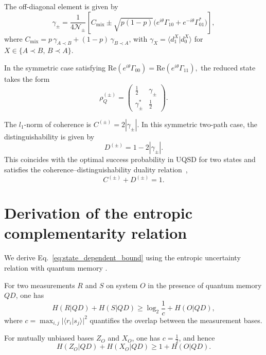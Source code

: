 \documentclass[aps,pra,reprint,superscriptaddress]{revtex4-2}
\begin{document}
The off-diagonal element is given by
\begin{equation}
\gamma_\pm
=
\frac{1}{4\mathcal{N}_\pm}
\left[
C_{\mathrm{mix}}
\pm
\sqrt{p(1-p)}
\big(
e^{i\theta}\Gamma_{10}
+
e^{-i\theta}\Gamma_{01}^*
\big)
\right],
\end{equation}
where $C_{\mathrm{mix}} = p\,\gamma_{A\prec B} + (1-p)\,\gamma_{B\prec A}$, with $\gamma_X = \langle d_1^{X} | d_0^{X} \rangle$ for $X \in \{A\prec B,\, B\prec A\}$.

\medskip

In the symmetric case satisfying
\(
\mathrm{Re}(e^{i\theta}\Gamma_{00})
=
\mathrm{Re}(e^{i\theta}\Gamma_{11}),
\)
the reduced state takes the form
\begin{equation}
\rho_Q^{(\pm)}
=
\begin{pmatrix}
\frac{1}{2} & \gamma_\pm \\
\gamma_\pm^* & \frac{1}{2}
\end{pmatrix}.
\end{equation}

The $l_1$-norm of coherence is $C^{(\pm)} = 2|\gamma_\pm|$. 
In this symmetric two-path case, the distinguishability is given by
\begin{equation}
D^{(\pm)} = 1 - 2|\gamma_\pm|.
\end{equation}
This coincides with the optimal success probability in UQSD for two states and satisfies the coherence--distinguishability duality relation~\cite{Bera2015},
\begin{equation}
C^{(\pm)} + D^{(\pm)} = 1.
\end{equation}

\section{Derivation of the entropic complementarity relation}
\label{app:entropic_derivation}

We derive Eq.~\eqref{eq:state_dependent_bound} using the entropic
uncertainty relation with quantum memory \cite{Berta2010}.

For two measurements $R$ and $S$ on system $O$ in the presence of quantum memory $QD$, one has
\begin{equation}
H(R|QD) + H(S|QD)
\ge \log_2 \frac{1}{c} + H(O|QD),
\end{equation}
where $c=\max_{i,j}|\langle r_i|s_j\rangle|^2$ quantifies the overlap between the measurement bases.

For mutually unbiased bases $Z_O$ and $X_O$, one has $c=\tfrac12$, and hence
\begin{equation}
H(Z_O|QD) + H(X_O|QD) \ge 1 + H(O|QD).
\end{equation}
\end{document}
